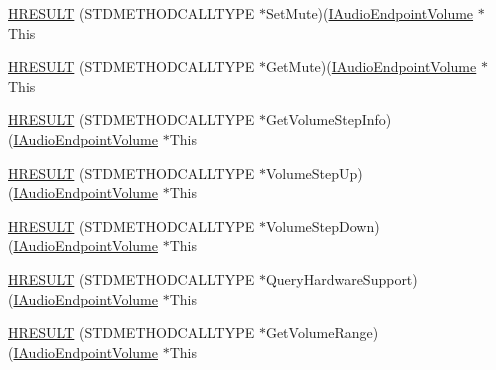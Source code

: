 \begin{DoxyCompactItemize}
\item 
\hyperlink{struct_i_audio_endpoint_volume_vtbl_a30f4e635cfc5cd63593a8984bd3b55c6}{H\+R\+E\+S\+U\+LT} (S\+T\+D\+M\+E\+T\+H\+O\+D\+C\+A\+L\+L\+T\+Y\+PE $\ast$Set\+Mute)(\hyperlink{endpointvolume_8h_a0aa518a24cb3834bf372f46cfc94e3cf}{I\+Audio\+Endpoint\+Volume} $\ast$This
\item 
\hyperlink{struct_i_audio_endpoint_volume_vtbl_a81cd47af352fc8205d482e6203034cff}{H\+R\+E\+S\+U\+LT} (S\+T\+D\+M\+E\+T\+H\+O\+D\+C\+A\+L\+L\+T\+Y\+PE $\ast$Get\+Mute)(\hyperlink{endpointvolume_8h_a0aa518a24cb3834bf372f46cfc94e3cf}{I\+Audio\+Endpoint\+Volume} $\ast$This
\item 
\hyperlink{struct_i_audio_endpoint_volume_vtbl_a5ba1f44537d060b855a11dbe1d32b723}{H\+R\+E\+S\+U\+LT} (S\+T\+D\+M\+E\+T\+H\+O\+D\+C\+A\+L\+L\+T\+Y\+PE $\ast$Get\+Volume\+Step\+Info)(\hyperlink{endpointvolume_8h_a0aa518a24cb3834bf372f46cfc94e3cf}{I\+Audio\+Endpoint\+Volume} $\ast$This
\item 
\hyperlink{struct_i_audio_endpoint_volume_vtbl_ab3137f2ccb0db15cbc8b3fcbbc88d0e6}{H\+R\+E\+S\+U\+LT} (S\+T\+D\+M\+E\+T\+H\+O\+D\+C\+A\+L\+L\+T\+Y\+PE $\ast$Volume\+Step\+Up)(\hyperlink{endpointvolume_8h_a0aa518a24cb3834bf372f46cfc94e3cf}{I\+Audio\+Endpoint\+Volume} $\ast$This
\item 
\hyperlink{struct_i_audio_endpoint_volume_vtbl_ade30a0028e822837392cef098ba25061}{H\+R\+E\+S\+U\+LT} (S\+T\+D\+M\+E\+T\+H\+O\+D\+C\+A\+L\+L\+T\+Y\+PE $\ast$Volume\+Step\+Down)(\hyperlink{endpointvolume_8h_a0aa518a24cb3834bf372f46cfc94e3cf}{I\+Audio\+Endpoint\+Volume} $\ast$This
\item 
\hyperlink{struct_i_audio_endpoint_volume_vtbl_a9c9859f5aabe1d48048b653882f7d4bf}{H\+R\+E\+S\+U\+LT} (S\+T\+D\+M\+E\+T\+H\+O\+D\+C\+A\+L\+L\+T\+Y\+PE $\ast$Query\+Hardware\+Support)(\hyperlink{endpointvolume_8h_a0aa518a24cb3834bf372f46cfc94e3cf}{I\+Audio\+Endpoint\+Volume} $\ast$This
\item 
\hyperlink{struct_i_audio_endpoint_volume_vtbl_a80db13a99f21ff56bd125900be9ca0d1}{H\+R\+E\+S\+U\+LT} (S\+T\+D\+M\+E\+T\+H\+O\+D\+C\+A\+L\+L\+T\+Y\+PE $\ast$Get\+Volume\+Range)(\hyperlink{endpointvolume_8h_a0aa518a24cb3834bf372f46cfc94e3cf}{I\+Audio\+Endpoint\+Volume} $\ast$This
\end{DoxyCompactItemize}
